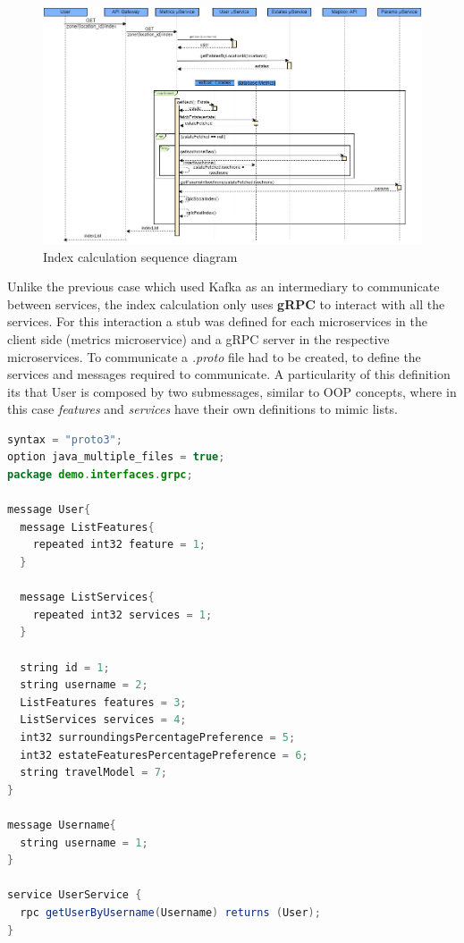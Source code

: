 \begin{figure}[h]
    \centering 
    \includegraphics[width=1\textwidth]{Chapters/img/backend/SequenceDiagram.png}
    \caption{Index calculation sequence diagram} 
    \label{fig:IndexSequenceDiagram}
\end{figure}

Unlike the previous case which used Kafka as an intermediary to communicate between services, the index calculation only uses \textbf{gRPC} to interact with all the services. For this interaction a stub was defined for each microservices in the client side (metrics microservice) and a gRPC server in the respective microservices. To communicate a \textit{.proto} file had to be created, to define the services and messages required to communicate. A particularity of this definition its that User is composed by two submessages, similar to OOP concepts, where in this case \textit{features} and \textit{services} have their own definitions to mimic lists.

\begin{lstlisting}[float, language=Java, caption={[GRPC message and service definitions]{GRPC message and service definitions for communication}}, captionpos=t]
syntax = "proto3";
option java_multiple_files = true;
package demo.interfaces.grpc;

message User{
  message ListFeatures{
    repeated int32 feature = 1;
  }

  message ListServices{
    repeated int32 services = 1;
  }

  string id = 1;
  string username = 2;
  ListFeatures features = 3;
  ListServices services = 4;
  int32 surroundingsPercentagePreference = 5;
  int32 estateFeaturesPercentagePreference = 6;
  string travelModel = 7;
}

message Username{
  string username = 1;
}

service UserService {
  rpc getUserByUsername(Username) returns (User);
}
\end{lstlisting}

